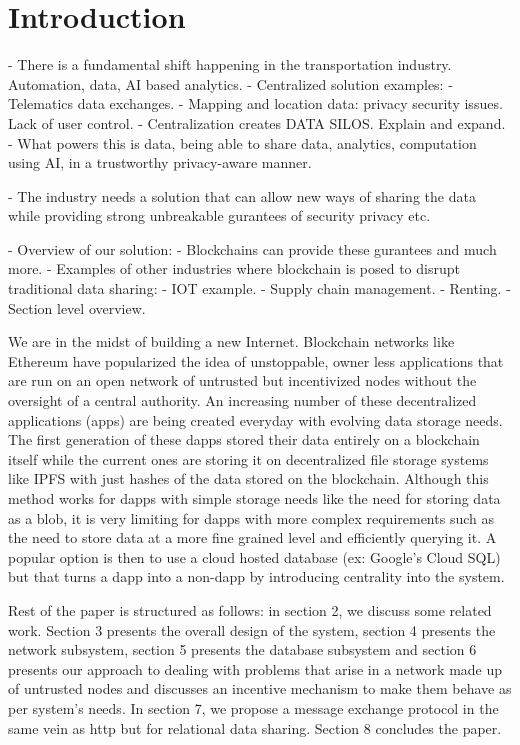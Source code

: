 \section{Introduction}\label{sec:intro}

- There is a fundamental shift happening in the transportation industry. Automation, data, AI based analytics.
- Centralized solution examples:
    - Telematics data exchanges.
    - Mapping and location data: privacy security issues. Lack of user control.
    - Centralization creates DATA SILOS. Explain and expand.
- What powers this is data, being able to share data, analytics, computation using AI, in a trustworthy privacy-aware
manner.

- The industry needs a solution that can allow new ways of sharing the data while providing strong unbreakable gurantees
of security privacy etc.


- Overview of our solution:
  - Blockchains can provide these gurantees and much more. 
  - Examples of other industries where blockchain is posed to disrupt traditional data sharing:
    - IOT example.
    - Supply chain management.
    - Renting.
  - Section level overview.

We are in the midst of building a new Internet. Blockchain networks like Ethereum have popularized the idea of unstoppable, owner less applications that are run on an open network of untrusted but incentivized nodes without the oversight of a central authority. An increasing number of these decentralized applications (\DJ apps) are being created everyday with evolving data storage needs. The first generation of these dapps stored their data entirely on a blockchain itself while the current ones are storing it on decentralized file storage systems like IPFS with just hashes of the data stored on the blockchain. Although this method works for dapps with simple storage needs like the need for storing data as a blob, it is very limiting for dapps with more complex requirements such as the need to store data at a more fine grained level and efficiently querying it. A popular option is then to use a cloud hosted database (ex: Google’s Cloud SQL) but that turns a dapp into a non-dapp by introducing centrality into the system. \newline\newline

Rest of the paper is structured as follows: in section 2, we discuss some related work. Section 3 presents the overall design of the system, section 4 presents the network subsystem, section 5 presents the database subsystem and section 6 presents our approach to dealing with problems that arise in a network made up of untrusted nodes and discusses an incentive mechanism to make them behave as per system's needs. In section 7, we propose a message exchange protocol in the same vein as http but for relational data sharing. Section 8 concludes the paper.


